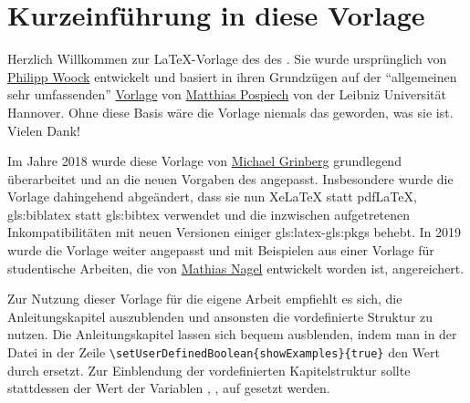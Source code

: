 %
\chapter*{Kurzeinführung in diese Vorlage}
%
%
%
%
%
Herzlich Willkommen zur \LaTeX-Vorlage
des  %
des . %
Sie wurde ursprünglich von
\href{https://ies.iar.kit.edu/1473_1575.php}{Philipp Woock}
entwickelt und basiert in ihren Grundzügen auf der \enquote{allgemeinen sehr umfassenden}
\href{http://www.matthiaspospiech.de/latex/templates/thesis/}{Vorlage} von 
\href{http://www.matthiaspospiech.de}{Matthias Pospiech} von der Leibniz Universität Hannover.
Ohne diese Basis wäre die Vorlage niemals das geworden, was sie ist. Vielen Dank!

Im Jahre 2018 wurde diese Vorlage von
\href{https://ies.iar.kit.edu/1473_1650.php}{Michael Grinberg}
grundlegend überarbeitet und an die neuen Vorgaben des  angepasst.
Insbesondere wurde die Vorlage dahingehend abgeändert, dass sie nun XeLaTeX statt pdfLaTeX, 
\gls{gls:biblatex} statt \gls{gls:bibtex} verwendet und die inzwischen aufgetretenen
Inkompatibilitäten mit neuen Versionen einiger \gls{gls:latex}-\glspl{gls:pkg} behebt.
In 2019 wurde die Vorlage weiter angepasst und mit Beispielen aus einer Vorlage
für studentische Arbeiten, die von
\href{https://crypto.iti.kit.edu/alumni_matthias_nagel.php}{Mathias Nagel}
entwickelt worden ist, angereichert.

Zur Nutzung dieser Vorlage für die eigene Arbeit empfiehlt es sich, 
die Anleitungskapitel auszublenden und ansonsten die vordefinierte Struktur zu nutzen.
Die Anleitungskapitel lassen sich bequem ausblenden, indem man in der Datei
 in der Zeile
\lstinline|\setUserDefinedBoolean{showExamples}{true}| 
den Wert  durch  ersetzt.
Zur Einblendung der vordefinierten Kapitelstruktur
sollte stattdessen der Wert der Variablen
,
,
\usw
auf  gesetzt werden.

